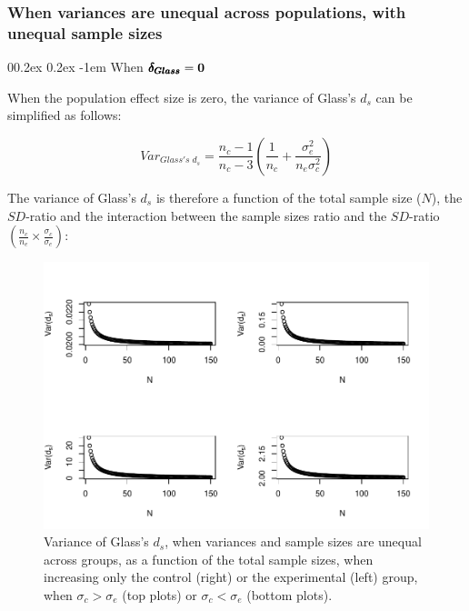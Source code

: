 \documentclass[
  english,
  man]{apa6}
\makeatletter
\let\oldparagraph\paragraph
\renewcommand{\paragraph}[1]{\oldparagraph{#1}\mbox{}}
\renewcommand{\paragraph}{\@startsection{paragraph}{4}{\parindent}%
  {0\baselineskip \@plus 0.2ex \@minus 0.2ex}%
  {-1em}%
  {\normalfont\normalsize\bfseries\itshape\typesectitle}}
\makeatother
\begin{document}
\hypertarget{when-variances-are-unequal-across-populations-with-unequal-sample-sizes}{%
\subsubsection{When variances are unequal across populations, with unequal sample sizes}\label{when-variances-are-unequal-across-populations-with-unequal-sample-sizes}}

\hypertarget{when-bf-pmbdelta_glass0-2}{%
\paragraph{\texorpdfstring{When \(\bf \pmb{\delta_{Glass}}=0\)}{When \textbackslash bf \textbackslash pmb\{\textbackslash delta\_\{Glass\}\}=0}}\label{when-bf-pmbdelta_glass0-2}}

When the population effect size is zero, the variance of Glass's \(d_s\) can be simplified as follows:

\[Var_{Glass's \; d_s} = \frac{n_c-1}{n_c-3} \left( \frac{1}{n_c}+\frac{\sigma^2_e}{n_e\sigma^2_c}\right)\]

The variance of Glass's \(d_s\) is therefore a function of the total sample size (\(N\)), the \(SD\)-ratio and the interaction between the sample sizes ratio and the \(SD\)-ratio \(\left(\frac{n_c}{n_e}\times\frac{\sigma_c}{\sigma_e} \right)\):

\begin{figure}
\centering
\includegraphics{Theoretical-Variance-of-all-estimators-as-a-function-of-population-parameters_files/figure-latex/varglassHetunbalNsize2-1.pdf}
\caption{\label{fig:varglassHetunbalNsize2}Variance of Glass's \(d_s\), when variances and sample sizes are unequal across groups, as a function of the total sample sizes, when increasing only the control (right) or the experimental (left) group, when \(\sigma_c > \sigma_e\) (top plots) or \(\sigma_c < \sigma_e\) (bottom plots).}
\end{figure}
\end{document}

